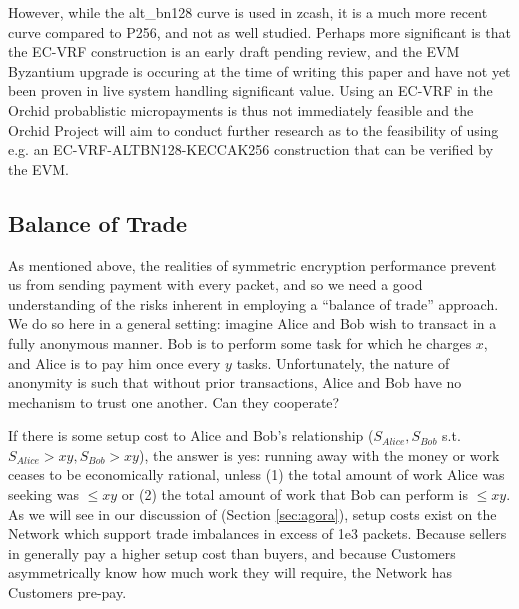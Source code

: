 However, while the alt\_bn128 curve is used in zcash, it is a much more recent curve compared to P256, and not as well studied. Perhaps more significant is that the EC-VRF construction is an early draft pending review, and the EVM Byzantium upgrade is occuring at the time of writing this paper and have not yet been proven in live system handling significant value. Using an EC-VRF in the Orchid probablistic micropayments is thus not immediately feasible and the Orchid Project will aim to conduct further research as to the feasibility of using e.g. an EC-VRF-ALTBN128-KECCAK256 construction that can be verified by the EVM.

\subsection{Balance of Trade}
\label{tokens-bot}

As mentioned above, the realities of symmetric encryption performance prevent us from sending payment with every packet, and so we need a good understanding of the risks inherent in employing a ``balance of trade'' approach. We do so here in a general setting: imagine Alice and Bob wish to transact in a fully anonymous manner. Bob is to perform some task for which he charges $x$, and Alice is to pay him once every $y$ tasks. Unfortunately, the nature of anonymity is such that without prior transactions, Alice and Bob have no mechanism to trust one another. Can they cooperate?

If there is some setup cost to Alice and Bob's relationship ($S_{Alice}, S_{Bob}$ s.t. $S_{Alice} > xy, S_{Bob} > xy$), the answer is yes: running away with the money or work ceases to be economically rational, unless (1) the total amount of work Alice was seeking was $\leq xy$ or (2) the total amount of work that Bob can perform is $\leq xy$. As we will see in our discussion of \tOM{} (Section \ref{sec:agora}), setup costs exist on the \Orchid{} Network which support trade imbalances in excess of 1e3 packets. Because sellers in \tOM{} generally pay a higher setup cost than buyers, and because Customers asymmetrically know how much work they will require, the \Orchid{} Network has Customers pre-pay.



